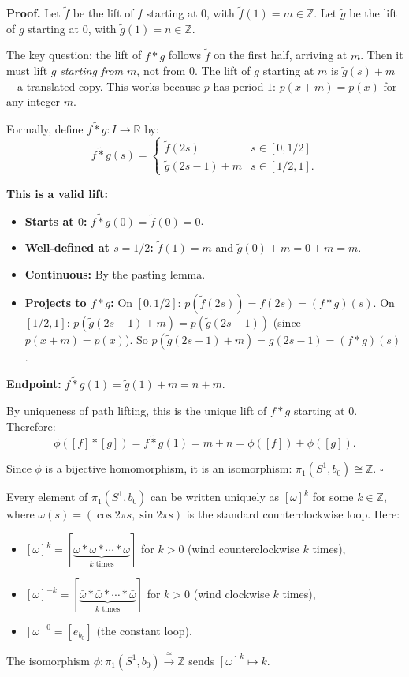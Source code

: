 \documentclass[11pt]{report}
\renewenvironment{proof}[1][Proof]{\noindent\textbf{#1.} }{\hfill$\square$\par\vspace{5pt}}
\begin{document}
\begin{proof}
Let $\tilde{f}$ be the lift of $f$ starting at $0$, with $\tilde{f}(1) = m \in \mathbb{Z}$. Let $\tilde{g}$ be the lift of $g$ starting at $0$, with $\tilde{g}(1) = n \in \mathbb{Z}$.

The key question: the lift of $f * g$ follows $\tilde{f}$ on the first half, arriving at $m$. Then it must lift $g$ \emph{starting from $m$}, not from $0$. The lift of $g$ starting at $m$ is $\tilde{g}(s) + m$---a translated copy. This works because $p$ has period $1$: $p(x + m) = p(x)$ for any integer $m$.

Formally, define $\widetilde{f * g}: I \to \mathbb{R}$ by:
\[\widetilde{f * g}(s) = \begin{cases} \tilde{f}(2s) & s \in [0, 1/2] \\ \tilde{g}(2s - 1) + m & s \in [1/2, 1]. \end{cases}\]

\textbf{This is a valid lift:}
\begin{itemize}[nosep]
    \item \textbf{Starts at $0$:} $\widetilde{f * g}(0) = \tilde{f}(0) = 0$. \checkmark
    \item \textbf{Well-defined at $s = 1/2$:} $\tilde{f}(1) = m$ and $\tilde{g}(0) + m = 0 + m = m$. \checkmark
    \item \textbf{Continuous:} By the pasting lemma. \checkmark
    \item \textbf{Projects to $f * g$:} On $[0, 1/2]$: $p(\tilde{f}(2s)) = f(2s) = (f * g)(s)$. On $[1/2, 1]$: $p(\tilde{g}(2s-1) + m) = p(\tilde{g}(2s-1))$ (since $p(x + m) = p(x)$). So $p(\tilde{g}(2s-1) + m) = g(2s-1) = (f * g)(s)$. \checkmark
\end{itemize}

\textbf{Endpoint:} $\widetilde{f * g}(1) = \tilde{g}(1) + m = n + m$.

By uniqueness of path lifting, this is the unique lift of $f * g$ starting at $0$. Therefore:
\[\phi([f] * [g]) = \widetilde{f * g}(1) = m + n = \phi([f]) + \phi([g]).\]

Since $\phi$ is a bijective homomorphism, it is an isomorphism: $\pi_1(S^1, b_0) \cong \mathbb{Z}$.
\end{proof}

\begin{thmbox}
Every element of $\pi_1(S^1, b_0)$ can be written uniquely as $[\omega]^k$ for some $k \in \mathbb{Z}$, where $\omega(s) = (\cos 2\pi s, \sin 2\pi s)$ is the standard counterclockwise loop. Here:
\begin{itemize}[nosep]
    \item $[\omega]^k = [\underbrace{\omega * \omega * \cdots * \omega}_{k \text{ times}}]$ for $k > 0$ (wind counterclockwise $k$ times),
    \item $[\omega]^{-k} = [\underbrace{\bar{\omega} * \bar{\omega} * \cdots * \bar{\omega}}_{k \text{ times}}]$ for $k > 0$ (wind clockwise $k$ times),
    \item $[\omega]^0 = [e_{b_0}]$ (the constant loop).
\end{itemize}
The isomorphism $\phi: \pi_1(S^1, b_0) \xrightarrow{\;\cong\;} \mathbb{Z}$ sends $[\omega]^k \mapsto k$.
\end{thmbox}
\end{document}
